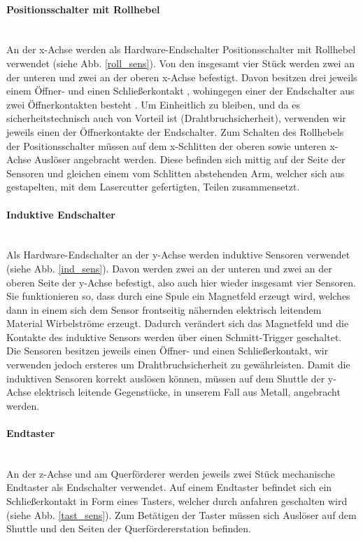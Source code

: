 \paragraph{Positionsschalter mit Rollhebel} \mbox{}\\
An der x-Achse werden als Hardware-Endschalter Positionsschalter mit Rollhebel verwendet (siehe Abb. \ref{roll_sens}). Von den insgesamt vier Stück werden zwei an der unteren und zwei an der oberen x-Achse befestigt. Davon besitzen drei jeweils einem Öffner- und einen Schließerkontakt \cite{schmersal_3}, wohingegen einer der Endschalter aus zwei Öffnerkontakten besteht \cite{schmersal_1}. Um Einheitlich zu bleiben, und da es sicherheitstechnisch auch von Vorteil ist (Drahtbruchsicherheit), verwenden wir jeweils einen der Öffnerkontakte der Endschalter. Zum Schalten des Rollhebels der Positionsschalter müssen auf dem x-Schlitten der oberen sowie unteren x-Achse Auslöser angebracht werden. Diese befinden sich mittig auf der Seite der Sensoren und gleichen einem vom Schlitten abstehenden Arm, welcher sich aus gestapelten, mit dem Lasercutter gefertigten, Teilen zusammensetzt.

\paragraph{Induktive Endschalter} \mbox{}\\
Als Hardware-Endschalter an der y-Achse werden induktive Sensoren verwendet (siehe Abb. \ref{ind_sens}). Davon werden zwei an der unteren und zwei an der oberen Seite der y-Achse befestigt, also auch hier wieder insgesamt vier Sensoren. Sie funktionieren so, dass durch eine Spule ein Magnetfeld erzeugt wird, welches dann in einem sich dem Sensor frontseitig nähernden elektrisch leitendem Material Wirbelströme erzeugt. Dadurch verändert sich das Magnetfeld und die Kontakte des induktive Sensors werden über einen Schmitt-Trigger geschaltet. Die Sensoren besitzen jeweils einen Öffner- und einen Schließerkontakt, wir verwenden jedoch ersteres um Drahtbruchsicherheit zu gewährleisten. Damit die induktiven Sensoren korrekt auslösen können, müssen auf dem Shuttle der y-Achse elektrisch leitende Gegenstücke, in unserem Fall aus Metall, angebracht werden.

\paragraph{Endtaster} \mbox{}\\
An der z-Achse und am Querförderer werden jeweils zwei Stück mechanische Endtaster als Endschalter verwendet. Auf einem Endtaster befindet sich ein Schließerkontakt in Form eines Tasters, welcher durch anfahren geschalten wird (siehe Abb. \ref{tast_sens}). Zum Betätigen der Taster müssen sich Auslöser auf dem Shuttle und den Seiten der Querfördererstation befinden.\\

